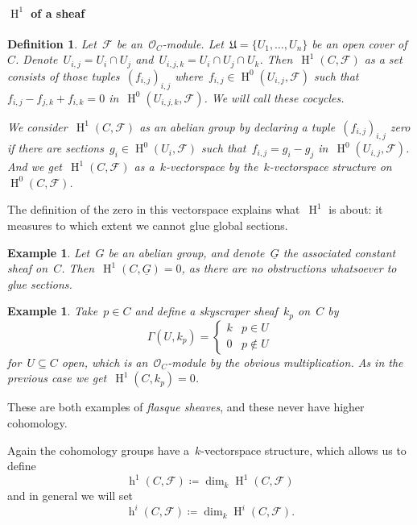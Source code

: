 \documentclass[10pt,a4paper]{article}
\theoremstyle{lecture}
\newtheorem{definition}[theorem]{Definition}
\newtheorem{example}[theorem]{Example}
\newcommand\dash{\nobreakdash-\hspace{0pt}}
\DeclareMathOperator\hh{h}
\DeclareMathOperator\HH{H}
\begin{document}
\paragraph{$\HH^1$ of a sheaf}
\begin{definition}
  Let~$\mathcal{F}$ be an~$\mathcal{O}_C$\dash module. Let~$\mathfrak{U}=\{U_1,\dotsc,U_n\}$ be an open cover of~$C$. Denote~$U_{i,j}=U_i\cap U_j$ and~$U_{i,j,k}=U_i\cap U_j\cap U_k$. Then~$\HH^1(C,\mathcal{F})$ \emph{as a set} consists of those tuples~$(f_{i,j})_{i,j}$ where~$f_{i,j}\in\HH^0(U_{i,j},\mathcal{F})$ such that~$f_{i,j}-f_{j,k}+f_{i,k}=0$ in~$\HH^0(U_{i,j,k},\mathcal{F})$. We will call these \emph{cocycles}.

  We consider~$\HH^1(C,\mathcal{F})$ \emph{as an abelian group} by declaring a tuple~$(f_{i,j})_{i,j}$ zero if there are sections~$g_i\in\HH^0(U_i,\mathcal{F})$ such that~$f_{i,j}=g_i-g_j$ in~$\HH^0(U_{i,j},\mathcal{F})$. And we get~$\HH^1(C,\mathcal{F})$ \emph{as a~$k$\dash vectorspace} by the~$k$\dash vectorspace structure on~$\HH^0(C,\mathcal{F})$.
\end{definition}
The definition of the zero in this vectorspace explains what~$\HH^1$ is about: it measures to which extent we cannot glue global sections.
\begin{example}
  Let~$G$ be an abelian group, and denote~$\underline{G}$ the associated constant sheaf on~$C$. Then~$\HH^1(C,\underline{G})=0$, as there are no obstructions whatsoever to glue sections.
\end{example}
\begin{example}
  Take~$p\in C$ and define a \emph{skyscraper sheaf}~$k_p$ on~$C$ by
  \begin{equation}
    \Gamma(U,k_p)=
    \begin{cases}
      k & p\in U \\
      0 & p\notin U
    \end{cases}
  \end{equation}
  for~$U\subseteq C$ open, which is an~$\mathcal{O}_C$\dash module by the obvious multiplication. As in the previous case we get~$\HH^1(C,k_p)=0$.
\end{example}
These are both examples of \emph{flasque sheaves}, and these never have higher cohomology.

Again the cohomology groups have a~$k$\dash vectorspace structure, which allows us to define
\begin{equation}
  \hh^1(C,\mathcal{F})\coloneqq\dim_k\HH^1(C,\mathcal{F})
\end{equation}
and in general we will set
\begin{equation}
  \hh^i(C,\mathcal{F})\coloneqq\dim_k\HH^i(C,\mathcal{F}).
\end{equation}
\end{document}
